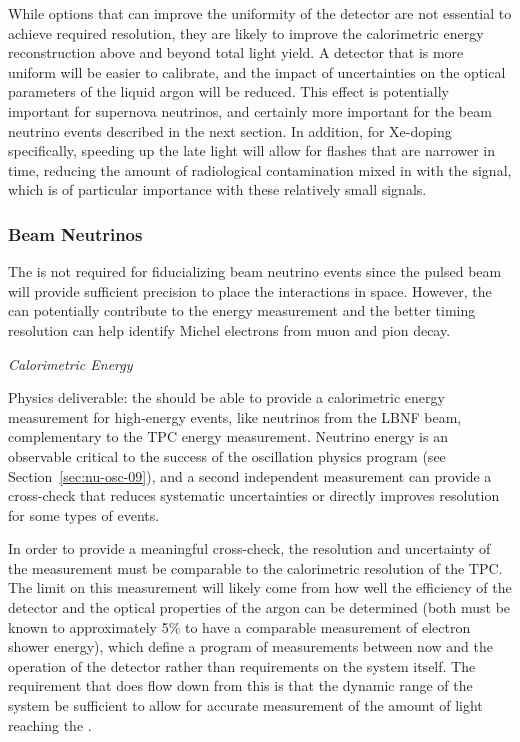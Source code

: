 While options that can improve the uniformity of the detector are not essential to achieve required resolution, they are likely to improve the calorimetric energy reconstruction above and beyond total light yield. A detector that is more uniform will be easier to calibrate, and the impact of uncertainties on the optical parameters of the liquid argon will be reduced. This effect is potentially important for supernova neutrinos, and certainly more important for the beam neutrino events described in the next section. In addition, for Xe-doping specifically, speeding up the late light will allow for flashes that are narrower in time, reducing the amount of radiological contamination mixed in with the signal, which is of particular importance with these relatively small signals.



\subsubsection{Beam Neutrinos}
\label{subsec:fdsp-pd-simphys-beam}

The  is not required for fiducializing beam neutrino events since the pulsed beam will provide sufficient precision to place the interactions in space. However, the  can potentially contribute to the energy measurement and the better timing resolution can help identify Michel electrons from muon and pion decay.


\textit{\it Calorimetric Energy}\nopagebreak

Physics deliverable: the  should be able to provide a calorimetric energy measurement for high-energy events, like neutrinos from the LBNF beam, complementary to the TPC energy measurement.
Neutrino energy is an observable critical to the success of the oscillation physics program (see Section~\ref{sec:nu-osc-09}), and a second independent measurement can provide a cross-check that reduces systematic uncertainties or directly improves resolution for some types of events. 

In order to provide a meaningful cross-check, the resolution and uncertainty of the  measurement must be comparable to the calorimetric resolution of the TPC. The limit on this measurement will likely come from how well the efficiency of the detector and the optical properties of the argon can be determined (both must be known to approximately 5\% to have a comparable measurement of electron shower energy), which define a program of measurements between now and the operation of the detector rather than requirements on the system itself. The requirement that does flow down from this is that the dynamic range of the system be sufficient to allow for accurate measurement of the amount of light reaching the . 


